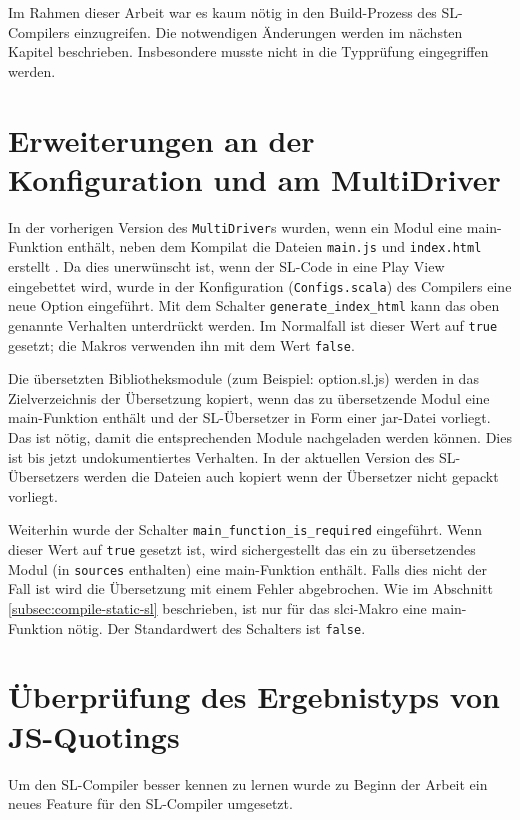 \documentclass[12pt,bibtotoc]{scrreprt}
\begin{document}
Im Rahmen dieser Arbeit war es kaum nötig in den Build-Prozess\cite[S. 16-19]{Bisping2013} des SL-Compilers einzugreifen. Die notwendigen Änderungen werden im nächsten Kapitel beschrieben. Insbesondere musste nicht in die Typprüfung eingegriffen werden.

\section{Erweiterungen an der Konfiguration und am MultiDriver}

In der vorherigen Version des \lstinline!MultiDriver!s wurden, wenn ein Modul eine main-Funktion enthält, neben dem Kompilat die Dateien \lstinline!main.js! und \lstinline!index.html! erstellt \cite[S. 18-19]{Bisping2013}. Da dies unerwünscht ist, wenn der \ac{SL}-Code in eine Play View eingebettet wird, wurde in der Konfiguration (\lstinline!Configs.scala!) des Compilers eine neue Option eingeführt. Mit dem Schalter \lstinline!generate_index_html! kann das oben genannte Verhalten unterdrückt werden. Im Normalfall ist dieser Wert auf \lstinline!true! gesetzt; die Makros verwenden ihn mit dem Wert \lstinline!false!.

Die übersetzten Bibliotheksmodule (zum Beispiel: option.sl.js) werden in das Zielverzeichnis der Übersetzung kopiert, wenn das zu übersetzende Modul eine main-Funktion enthält und der SL-Übersetzer in Form einer jar-Datei vorliegt. Das ist nötig, damit die entsprechenden Module nachgeladen werden können. Dies ist bis jetzt undokumentiertes Verhalten. In der aktuellen Version des SL-Übersetzers werden die Dateien auch kopiert wenn der Übersetzer nicht gepackt vorliegt.

Weiterhin wurde der Schalter \lstinline!main_function_is_required! eingeführt. Wenn dieser Wert auf \lstinline!true! gesetzt ist, wird sichergestellt das ein zu übersetzendes Modul (in \lstinline!sources! enthalten) eine main-Funktion enthält. Falls dies nicht der Fall ist wird die Übersetzung mit einem Fehler abgebrochen. Wie im Abschnitt \ref{subsec:compile-static-sl} beschrieben, ist nur für das slci-Makro eine main-Funktion nötig. Der Standardwert des Schalters ist \lstinline!false!.

\section{Überprüfung des Ergebnistyps von \ac{JS}-Quotings}

Um den SL-Compiler besser kennen zu lernen wurde zu Beginn der Arbeit ein neues Feature für den SL-Compiler umgesetzt.
\end{document}
